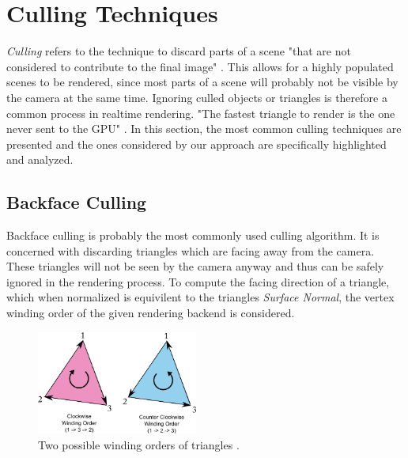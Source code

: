 \section{Culling Techniques} \label{sec-culling-techniques}

\emph{Culling} refers to the technique to discard parts of a scene "that are not considered to contribute to the final 
image" \cite{AkenineMoeller2018}. This allows for a highly populated scenes to be rendered, since most parts of a scene 
will probably not be visible by the camera at the same time. Ignoring culled objects or triangles is therefore a common 
process in realtime rendering. "The fastest triangle to render is the one never sent to the \ac{GPU}" 
\cite{AkenineMoeller2018}. In this section, the most common culling techniques are presented and the ones considered by 
our approach are specifically highlighted and analyzed. 


\subsection{Backface Culling} \label{subsec-backface-culling}

Backface culling is probably the most commonly used culling algorithm. It is concerned with discarding triangles which 
are facing away from the camera. These triangles will not be seen by the camera anyway and thus can be safely ignored 
in the rendering process. To compute the facing direction of a triangle, which when normalized is equivilent to the 
triangles \emph{Surface Normal}, the vertex winding order of the given rendering backend is considered.\\

\begin{figure}[h]
    \centering
    \includegraphics[width=200px]{images/graphics/winding-order-triangle.png}
    \caption{Two possible winding orders of triangles \cite{Michel2016}.}
    \label{fig:triangle-winding-order}
\end{figure}

